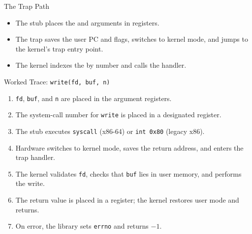 \documentclass[aspectratio=169]{beamer}
\begin{document}
\begin{frame}{The Trap Path}
  \centering
  \vspace{0.2cm}
  \begin{itemize}
    \item The stub places the  and arguments in
      registers.
    \item The trap saves the user PC and flags, switches to kernel mode, and
      jumps to the kernel's trap entry point.
    \item The kernel indexes the  by number and calls
      the handler.
  \end{itemize}
\end{frame}

\begin{frame}{Worked Trace: \texttt{write(fd, buf, n)}}
  \begin{enumerate}
    \item \texttt{fd}, \texttt{buf}, and \texttt{n} are placed in the
      argument registers.
    \item The system-call number for \texttt{write} is placed in a designated
      register.
    \item The stub executes \texttt{syscall} (x86-64) or \texttt{int 0x80}
      (legacy x86).
    \item Hardware switches to kernel mode, saves the return address, and
      enters the trap handler.
    \item The kernel validates \texttt{fd}, checks that \texttt{buf} lies in
      user memory, and performs the write.
    \item The return value is placed in a register; the kernel restores user
      mode and returns.
    \item On error, the library sets \texttt{errno} and returns $-1$.
  \end{enumerate}
  \vspace{0.1cm}
\end{frame}
\end{document}
